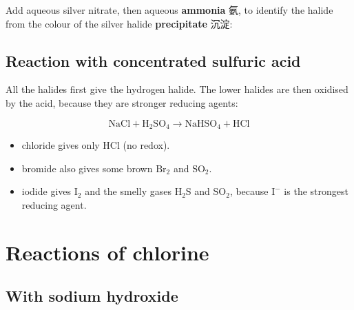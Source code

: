 \documentclass[11pt]{article}
\begin{document}
Add aqueous silver nitrate, then aqueous \textbf{ammonia} 氨, to identify the halide from the colour of the silver halide \textbf{precipitate} 沉淀:

\begin{center}
\end{center}

\subsection*{Reaction with concentrated sulfuric acid}

All the halides first give the hydrogen halide. The lower halides are then oxidised by the acid, because they are stronger reducing agents:

\[
\text{NaCl} + \text{H}_2\text{SO}_4 \rightarrow \text{NaHSO}_4 + \text{HCl}
\]

\begin{itemize}
\item chloride gives only $\text{HCl}$ (no redox).

\item bromide also gives some brown $\text{Br}_2$ and $\text{SO}_2$.

\item iodide gives $\text{I}_2$ and the smelly gases $\text{H}_2\text{S}$ and $\text{SO}_2$, because $\text{I}^-$ is the strongest reducing agent.

\end{itemize}

\section*{Reactions of chlorine}

\subsection*{With sodium hydroxide}
\end{document}

